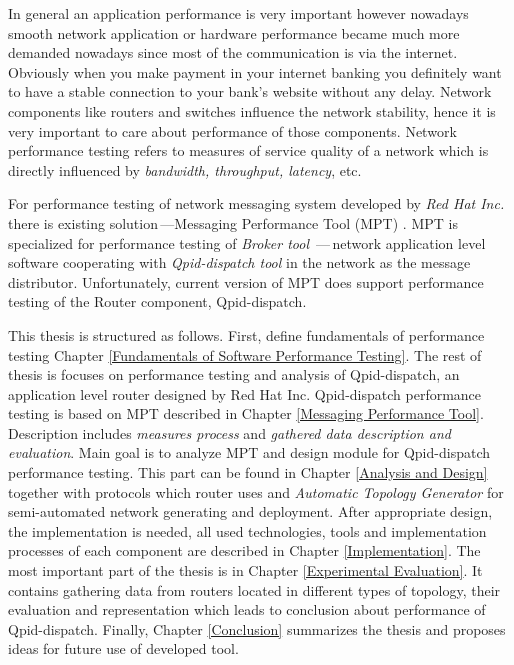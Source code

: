 In general an application performance is very important however nowadays smooth network application or hardware performance became much more demanded nowadays since most of the communication is via the internet.  Obviously when you make payment in your internet banking you definitely want to have a stable connection to your bank's website without any delay. Network components like routers and switches influence the network stability, hence it is very important to care about performance of those components. Network performance testing refers to measures of service quality of a network which is directly influenced by \emph{bandwidth, throughput, latency}, etc. 

For performance testing of network messaging system developed by \emph{Red Hat Inc.} there is existing solution\,---Messaging Performance Tool (MPT) \cite{ORPISKE:MSGPT}. MPT is specialized for performance testing of \emph{Broker tool} \cite{RH:Broker}\,---\,network application level software cooperating with \emph{Qpid-dispatch tool} \cite{RH:Interconnect} in the network as the message distributor. Unfortunately, current version of MPT does support performance testing of the Router component, Qpid-dispatch. 

This thesis is structured as follows. First, define fundamentals of performance testing Chapter \ref{Fundamentals of Software Performance Testing}. The rest of thesis is focuses on performance testing and analysis of Qpid-dispatch, an application level router designed by Red Hat Inc. Qpid-dispatch performance testing is based on MPT described in Chapter \ref{Messaging Performance Tool}. Description includes \emph{measures process} and \emph{gathered data description and evaluation}. Main goal is to analyze MPT and design module for Qpid-dispatch performance testing. This part can be found in Chapter \ref{Analysis and Design} together with protocols which router uses and \emph{Automatic Topology Generator} for semi-automated network generating and deployment. After appropriate design, the implementation is needed, all used technologies, tools and  implementation processes of each component are described in Chapter \ref{Implementation}. The most important part of the thesis is in Chapter \ref{Experimental Evaluation}. It contains gathering data from routers located in different types of topology, their evaluation and representation which leads to conclusion about performance of Qpid-dispatch. Finally, Chapter \ref{Conclusion} summarizes the thesis and proposes ideas for future use of developed tool.

